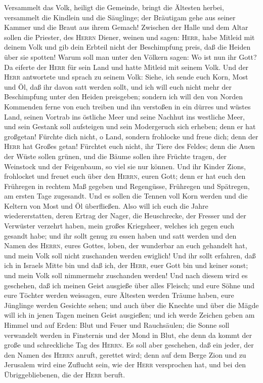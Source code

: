  Versammelt das Volk, heiligt die Gemeinde, bringt die
Ältesten herbei, versammelt die Kindlein und die Säuglinge; der
Bräutigam gehe aus seiner Kammer und die Braut aus ihrem Gemach!
 Zwischen der Halle und dem Altar sollen die Priester,
des \textsc{Herrn} Diener, weinen und sagen: \textsc{Herr}, habe Mitleid
mit deinem Volk und gib dein Erbteil nicht der Beschimpfung preis, daß
die Heiden über sie spotten! Warum soll man unter den Völkern sagen: Wo
ist nun ihr Gott?  Da eiferte der \textsc{Herr} für sein
Land und hatte Mitleid mit seinem Volk.  Und der
\textsc{Herr} antwortete und sprach zu seinem Volk: Siehe, ich sende
euch Korn, Most und Öl, daß ihr davon satt werden sollt, und ich will
euch nicht mehr der Beschimpfung unter den Heiden preisgeben;
 sondern ich will den von Norden Kommenden ferne von euch
treiben und ihn verstoßen in ein dürres und wüstes Land, seinen Vortrab
ins östliche Meer und seine Nachhut ins westliche Meer, und sein Gestank
soll aufsteigen und sein Modergeruch sich erheben; denn er hat
großgetan!  Fürchte dich nicht, o Land, sondern frohlocke
und freue dich; denn der \textsc{Herr} hat Großes getan! 
Fürchtet euch nicht, ihr Tiere des Feldes; denn die Auen der Wüste
sollen grünen, und die Bäume sollen ihre Früchte tragen, der Weinstock
und der Feigenbaum, so viel sie nur können.  Und ihr
Kinder Zions, frohlocket und freuet euch über den \textsc{Herrn}, euren
Gott; denn er hat euch den Frühregen in rechtem Maß gegeben und
Regengüsse, Frühregen und Spätregen, am ersten Tage zugesandt.
 Und es sollen die Tennen voll Korn werden und die
Keltern von Most und Öl überfließen.  Also will ich euch
die Jahre wiedererstatten, deren Ertrag der Nager, die Heuschrecke, der
Fresser und der Verwüster verzehrt haben, mein großes Kriegsheer,
welches ich gegen euch gesandt habe;  und ihr sollt genug
zu essen haben und satt werden und den Namen des \textsc{Herrn}, eures
Gottes, loben, der wunderbar an euch gehandelt hat, und mein Volk soll
nicht zuschanden werden ewiglich!  Und ihr sollt
erfahren, daß ich in Israels Mitte bin und daß ich, der \textsc{Herr},
euer Gott bin und keiner sonst; und mein Volk soll nimmermehr zuschanden
werden!  Und nach diesem wird es geschehen, daß ich
meinen Geist ausgieße über alles Fleisch; und eure Söhne und eure
Töchter werden weissagen, eure Ältesten werden Träume haben, eure
Jünglinge werden Gesichte sehen;  und auch über die
Knechte und über die Mägde will ich in jenen Tagen meinen Geist
ausgießen;  und ich werde Zeichen geben am Himmel und auf
Erden: Blut und Feuer und Rauchsäulen;  die Sonne soll
verwandelt werden in Finsternis und der Mond in Blut, ehe denn da kommt
der große und schreckliche Tag des \textsc{Herrn}.  Es
soll aber geschehen, daß ein jeder, der den Namen des \textsc{Herrn}
anruft, gerettet wird; denn auf dem Berge Zion und zu Jerusalem wird
eine Zuflucht sein, wie der \textsc{Herr} versprochen hat, und bei den
Übriggebliebenen, die der \textsc{Herr} beruft.


